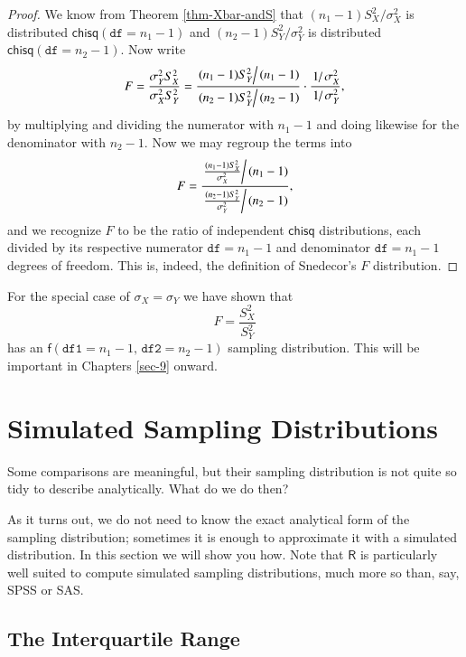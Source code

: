\documentclass[captions=tableheading]{scrbook}
\begin{document}
\begin{proof}
We know from Theorem \ref{thm-Xbar-andS} that \((n_{1}-1)S_{X}^{2}/\sigma_{X}^{2}\) is distributed \(\mathsf{chisq}(\mathtt{df}=n_{1}-1)\) and \((n_{2}-1)S_{Y}^{2}/\sigma_{Y}^{2}\) is distributed \(\mathsf{chisq}(\mathtt{df}=n_{2}-1)\). Now write
\[
F=\frac{\sigma_{Y}^{2}S_{X}^{2}}{\sigma_{X}^{2}S_{Y}^{2}}=\frac{\left.(n_{1}-1)S_{Y}^{2}\right/ (n_{1}-1)}{\left.(n_{2}-1)S_{Y}^{2}\right/ (n_{2}-1)}\cdot\frac{\left.1\right/ \sigma_{X}^{2}}{\left.1\right/ \sigma_{Y}^{2}},
\]
by multiplying and dividing the numerator with \(n_{1}-1\) and doing likewise for the denominator with \(n_{2}-1\). Now we may regroup the terms into
\[
F=\frac{\left.\frac{(n_{1}-1)S_{X}^{2}}{\sigma_{X}^{2}}\right/ (n_{1}-1)}{\left.\frac{(n_{2}-1)S_{Y}^{2}}{\sigma_{Y}^{2}}\right/ (n_{2}-1)},
\]
and we recognize \(F\) to be the ratio of independent \(\mathsf{chisq}\) distributions, each divided by its respective numerator \(\mathtt{df}=n_{1}-1\) and denominator \(\mathtt{df}=n_{1}-1\) degrees of freedom. This is, indeed, the definition of Snedecor's \(F\) distribution. 
\end{proof}

\begin{rem}
For the special case of \(\sigma_{X}=\sigma_{Y}\) we have shown that
\begin{equation}
F=\frac{S_{X}^{2}}{S_{Y}^{2}}
\end{equation}
has an \(\mathsf{f}(\mathtt{df1}=n_{1}-1,\,\mathtt{df2}=n_{2}-1)\) sampling distribution. This will be important in Chapters \ref{sec-9} onward.
\end{rem}
\section{Simulated Sampling Distributions}
\label{sec-8-5}
\label{sec-Simulated-Sampling-Distributions}


Some comparisons are meaningful, but their sampling distribution is not quite so tidy to describe analytically. What do we do then?

As it turns out, we do not need to know the exact analytical form of the sampling distribution; sometimes it is enough to approximate it with a simulated distribution. In this section we will show you how. Note that \(\mathsf{R}\) is particularly well suited to compute simulated sampling distributions, much more so than, say, SPSS or SAS.
\subsection{The Interquartile Range}
\label{sec-8-5-1}
\end{document}
